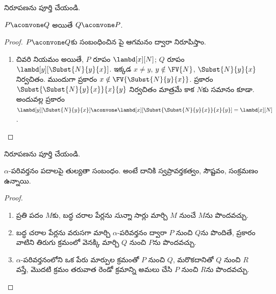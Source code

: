 \documentclass[../../../include/open-logic-section]{subfiles}
\begin{document}
\begin{prob}
   నిరూపణను పూర్తి చేయండి.
\end{prob}

\begin{lem}
  $P \aconvone Q$ అయితే $Q \aconvone P$.
\end{lem}

\begin{proof}
  $P \aconvone Q$కు సంబంధించిన పై
  ఆగమనం ద్వారా నిరూపిస్తాం.
  \begin{enumerate}
  \item చివరి నియమం  అయితే,
    $P$ రూపం $\lambd[x][N]$; $Q$ రూపం
    $\lambd[y][\Subst{N}{y}{x}]$. ఇక్కడ $x \neq y$,
    $y \notin \FV{N}$, $\Subst{N}{y}{x}$ నిర్వచితం.
    ముందుగా  ప్రకారం
    $x \notin \FV{\Subst{N}{y}{x}}$.
     ప్రకారం
    $\Subst{\Subst{N}{y}{x}}{x}{y}$ నిర్వచితం మాత్రమే కాక
    $N$కు సమానం కూడా. అందువల్ల  ప్రకారం
    $\lambd[y][\Subst{N}{y}{x}]
    \aconvone \lambd[x][\Subst{\Subst{N}{y}{x}}{x}{y}] =
    \lambd[x][N]$.
  \end{enumerate}
\end{proof}

\begin{prob}
   నిరూపణను పూర్తి చేయండి.
\end{prob}

\begin{thm}
  $\alpha$-పరివర్తనం పదాలపై తుల్యతా సంబంధం. అంటే దానికి
  స్వప్రావర్తకత్వం, సౌష్టవం, సంక్రమణం ఉన్నాయి.
\end{thm}

\begin{proof}
  \begin{enumerate}
  \item ప్రతి పదం $M$కు, బద్ధ చరాల పేర్లను \emph{సున్నా}
    సార్లు మార్చి $M$ నుంచే $M$ను పొందవచ్చు.
  \item బద్ధ చరాల పేర్లను వరుసగా మార్చి $\alpha$-పరివర్తనం ద్వారా $P$ నుంచి $Q$ను పొందితే,
     ప్రకారం వాటిని తిరుగు క్రమంలో వెనక్కి
    మార్చి $Q$ నుంచి $P$ను పొందవచ్చు.
  \item $\alpha$-పరివర్తనంలోని ఒక పేరు మార్పుల క్రమంతో $P$ నుంచి $Q$, మరొకదానితో
    $Q$ నుంచి $R$ వస్తే, మొదటి క్రమం తరువాత రెండో క్రమాన్ని
    అమలు చేసి $P$ నుంచి $R$ను పొందవచ్చు.
  \end{enumerate}
\end{proof}
\end{document}
